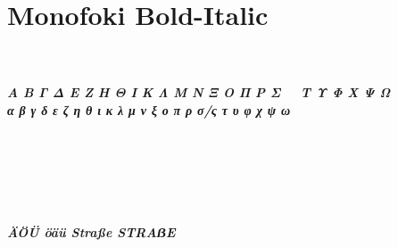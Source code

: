 \documentclass[12pt, a4paper]{article}
\begin{document}
\newpage

\section*{Monofoki Bold-Italic}

\noindent\textit{\textbf{%
\noindent\AZtext\\
\noindent\aztext\\
\noindent Α Β Γ Δ Ε Ζ Η Θ Ι Κ Λ Μ Ν Ξ Ο Π Ρ Σ~~ Τ Υ Φ Χ Ψ Ω\\
\noindent α β γ δ ε ζ η θ ι κ λ μ ν ξ ο π ρ σ/ς τ υ φ χ ψ ω\\
\noindent\digitstext\\
\noindent\punctext\\
~\\
~\\
\lipsum[0-1]
~\\
~\\
\noindent ÄÖÜ öäü Straße STRAẞE\\
}}

\newpage
\end{document}
